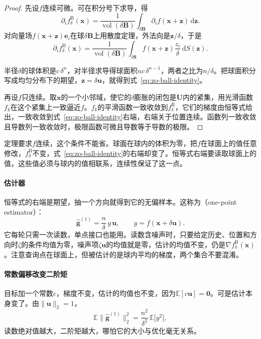 \begin{proof}
先设$f$连续可微。可在积分号下求导，得
\[
 \partial_if^{\mathrm{B}}_{\delta}(\bm{x})=\frac{1}{\operatorname{vol}(\delta\bm{B})}\int_{\delta\bm{B}}\partial_if(\bm{x}+\bm{z})\,\mathrm{d}\bm{z}.
\]
对向量场$f(\bm{x}+\bm{z})\bm{e}_i$在球$\delta\bm{B}$上用散度定理，外法向是$\bm{z}/\delta$，于是
\[
 \partial_if^{\mathrm{B}}_{\delta}(\bm{x})=\frac{1}{\operatorname{vol}(\delta\bm{B})}\int_{\delta\bm{S}}f(\bm{x}+\bm{z})\frac{z_i}{\delta}\,\mathrm{d}S(\bm{z}).
\]

半径$\delta$的球体积是$c\,\delta^n$，对半径求导得球面积$nc\,\delta^{n-1}$，两者之比为$n/\delta$。把球面积分写成均匀分布下的期望，$\bm{z}=\delta\bm{u}$，就得到式~\eqref{eq:zo-ball-identity}。

再设$f$只连续。取$\bm{x}$的一个小邻域，使它的$\delta$膨胀的闭包是$\bm{U}$内的紧集，用光滑函数$f_k$在这个紧集上一致逼近$f$。$f_k$的平滑函数一致收敛到$f^{\mathrm{B}}_{\delta}$，它们的梯度由恒等式给出，一致收敛到式~\eqref{eq:zo-ball-identity}右端，右端关于位置连续。函数列一致收敛且导数列一致收敛时，极限函数可微且导数等于导数的极限。
\end{proof}

定理要求$f$连续，这个条件不能省。球面在球内的体积为零，把$f$在球面上的值任意修改，$f^{\mathrm{B}}_{\delta}$不变，式~\eqref{eq:zo-ball-identity}的右端却变了。恒等式右端要读取球面上的值，这些值必须与球内的值相联系，连续性保证了这一点。

\paragraph{估计器}
恒等式的右端是期望，抽一个方向就得到它的无偏样本。这称为（one-point estimator）：
\begin{equation}
 \hat{\bm{g}}^{(1)}=\frac{n}{\delta}\,y\,\bm{u},\qquad y=f(\bm{x}+\delta\bm{u}).
 \label{eq:zo-one-point}
\end{equation}
它每轮只需一次读数，单点接口也能用。读数含噪声时，只要给定历史、位置和方向时$\zeta$的条件均值为零，噪声项$\zeta\bm{u}$的均值就是零，估计的均值不变，仍是$\nabla f^{\mathrm{B}}_{\delta}(\bm{x})$。注意查询点在球面上，但被估计的是球内平均的梯度，两个集合不要混淆。

\paragraph{常数偏移改变二阶矩}
目标加一个常数$c$，梯度不变，估计的均值也不变，因为$\mathbb{E}[c\bm{u}]=\bm{0}$。可是估计本身变了。由$\lVert\bm{u}\rVert_2=1$，
\begin{equation}
 \mathbb{E}\lVert\hat{\bm{g}}^{(1)}\rVert_2^2=\frac{n^2}{\delta^2}\,\mathbb{E}\bigl[y^2\bigr],
 \label{eq:zo-one-point-moment}
\end{equation}
读数绝对值越大，二阶矩越大，哪怕它的大小与优化毫无关系。

